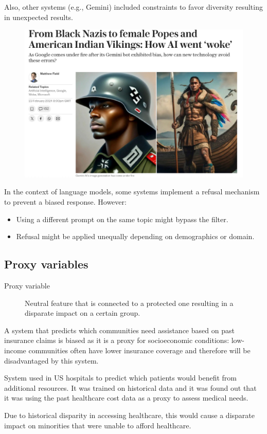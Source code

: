 \begin{example}[Generative AI]
    Also, other systems (e.g., Gemini) included constraints to favor diversity resulting in unexpected results.

    \begin{figure}[H]
        \centering
        \includegraphics[width=0.45\linewidth]{./img/gemini_diversity.png}
    \end{figure}

    In the context of language models, some systems implement a refusal mechanism to prevent a biased response. However:
    \begin{itemize}
        \item Using a different prompt on the same topic might bypass the filter.
        \item Refusal might be applied unequally depending on demographics or domain.
    \end{itemize}
\end{example}


\subsection{Proxy variables}

\begin{description}
    \item[Proxy variable] 
        Neutral feature that is connected to a protected one resulting in a disparate impact on a certain group.
\end{description}

\begin{example}
    A system that predicts which communities need assistance based on past insurance claims is biased as it is a proxy for socioeconomic conditions: low-income communities often have lower insurance coverage and therefore will be disadvantaged by this system.
\end{example}

\begin{example}
    System used in US hospitals to predict which patients would benefit from additional resources. It was trained on historical data and it was found out that it was using the past healthcare cost data as a proxy to assess medical needs.

    Due to historical disparity in accessing healthcare, this would cause a disparate impact on minorities that were unable to afford healthcare.
\end{example}

